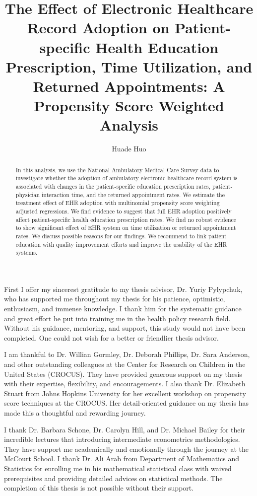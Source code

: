\documentclass[12pt]{report}
\title{The Effect of Electronic Healthcare Record Adoption
on Patient-specific Health Education Prescription, Time Utilization, and Returned Appointments: A Propensity Score Weighted Analysis}
\author{Huade Huo}
\begin{document}

\maketitle    %

\begin{abstract}
In this analysis, we use the National Ambulatory Medical Care Survey data to investigate whether the adoption of ambulatory electronic healthcare record system is associated with changes in the patient-specific education prescription rates, patient-physician interaction time, and the returned appointment rates. We estimate the treatment effect of EHR adoption with multinomial propensity score weighting adjusted regressions. We find evidence to suggest that full EHR adoption positively affect patient-specific health education prescription rates. We find no robust evidence to show significant effect of EHR system on time utilization or returned appointment rates. We discuss possible reasons for our findings. We recommend to link patient education with quality improvement efforts and improve the usability of the EHR systems.
\end{abstract}


First I offer my sincerest gratitude to my thesis advisor, Dr. Yuriy Pylypchuk, who has supported me throughout my thesis for his patience, optimistic, enthusiasm, and immense knowledge. I thank him for the systematic guidance and great effort he put into training me in the health policy research field. Without his guidance, mentoring, and support, this study would not have been completed. One could not wish for a better or friendlier thesis advisor.

I am thankful to Dr. Willian Gormley, Dr. Deborah Phillips, Dr. Sara Anderson, and other outstanding colleagues at the Center for Research on Children in the United States (CROCUS). They have provided generous support on my thesis with their expertise, flexibility, and encouragements. I also thank Dr. Elizabeth Stuart from Johns Hopkins University for her excellent workshop on propensity score techniques at the CROCUS. Her detail-oriented guidance on my thesis has made this a thoughtful and rewarding journey.

I thank Dr. Barbara Schone, Dr. Carolyn Hill, and Dr. Michael Bailey for their incredible lectures that introducing intermediate econometrics methodologies. They have support me academically and emotionally through the journey at the McCourt School. I thank Dr. Ali Arab from Department of Mathematics and Statistics for enrolling me in his mathematical statistical class with waived prerequisites and providing detailed advices on statistical methods. The completion of this thesis is not possible without their support.
\end{document}
